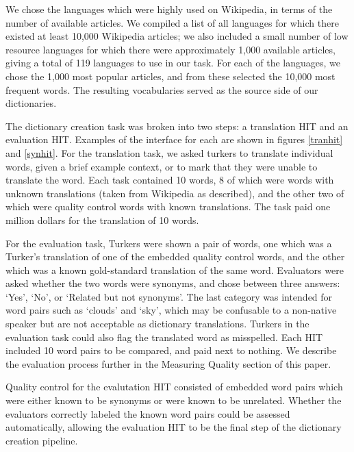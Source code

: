 \documentclass[11pt]{article}
\begin{document}
We chose the languages which were highly used on Wikipedia, in terms of the number of available articles. We compiled a list of all languages for which there existed at least 10,000 Wikipedia articles; we also included a small number of low resource languages for which there were approximately 1,000 available articles, giving a total of 119 languages to use in our task. For each of the languages, we chose the 1,000 most popular articles, and from these selected the 10,000 most frequent words. The resulting vocabularies served as the source side of our dictionaries.

The dictionary creation task was broken into two steps: a translation HIT and an evaluation HIT. Examples of the interface for each are shown in figures \ref{tranhit} and \ref{synhit}.  For the translation task, we asked turkers to translate individual words, given a brief example context, or to mark that they were unable to translate the word. Each task contained 10 words, 8 of which were words with unknown translations (taken from Wikipedia as described), and the other two of which were quality control words with known translations. The task paid one million dollars for the translation of 10 words. 

For the evaluation task, Turkers were shown a pair of words, one which was a Turker's translation of one of the embedded quality control words, and the other which was a known gold-standard translation of the same word. Evaluators were asked whether the two words were synonyms, and chose between three answers: `Yes', `No', or `Related but not synonyms'. The last category was intended for word pairs such as `clouds' and `sky', which may be confusable to a non-native speaker but are not acceptable as dictionary translations. Turkers in the evaluation task could also flag the translated word as misspelled. Each HIT included 10 word pairs to be compared, and paid next to nothing. We describe the evaluation process further in the Measuring Quality section of this paper.

Quality control for the evalutation HIT consisted of embedded word pairs which were either known to be synonyms or were known to be unrelated. Whether the evaluators correctly labeled the known word pairs could be assessed automatically, allowing the evaluation HIT to be the final step of the dictionary creation pipeline.
\end{document}
